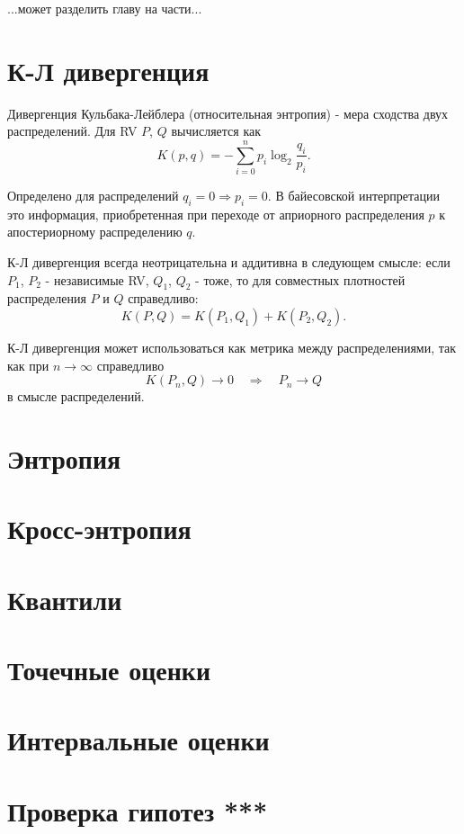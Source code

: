 ...может разделить главу на части...


\section{К-Л дивергенция}

Дивергенция Кульбака-Лейблера (относительная энтропия) - мера сходства двух распределений. Для RV $P$, $Q$ вычисляется как
$$
K(p, q) = -\sum_{i=0}^np_i\log_2\frac{q_i}{p_i}.
$$

Определено для распределений $q_i = 0 \Rightarrow p_i=0$.
В байесовской интерпретации это информация, приобретенная при переходе от априорного распределения $p$ к апостериорному распределению $q$.

К-Л дивергенция всегда неотрицательна и аддитивна в следующем смысле: если $P_1$, $P_2$ - независимые RV, $Q_1$, $Q_2$ - тоже, то для совместных плотностей распределения $P$ и $Q$ справедливо:
$$
K(P, Q) =  K(P_1, Q_1) + K(P_2, Q_2).
$$

К-Л дивергенция может использоваться как метрика между распределениями, так как при $n \rightarrow \infty$ справедливо
$$
K(P_n, Q) \rightarrow 0 \quad \Rightarrow \quad P_n \rightarrow Q
$$
в смысле распределений.

\section{Энтропия}


\section{Кросс-энтропия}


\section{Квантили}


\section{Точечные оценки}


\section{Интервальные оценки}


\section{Проверка гипотез ***}

